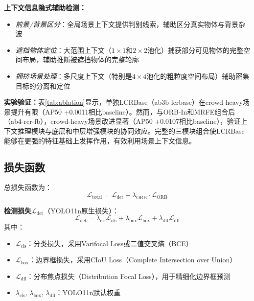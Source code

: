\documentclass[journal]{IEEEtran}
\begin{document}
\textbf{上下文信息隐式辅助检测：}
\begin{itemize}
    \item \textit{前景/背景区分}：全局场景上下文提供判别线索，辅助区分真实物体与背景杂波
    \item \textit{遮挡物体定位}：大范围上下文（$1 \times 1$和$2 \times 2$池化）捕获部分可见物体的完整空间布局，辅助推断被遮挡物体的完整轮廓
    \item \textit{拥挤场景处理}：多尺度上下文（特别是$4 \times 4$池化的粗粒度空间布局）辅助密集目标的分离和定位
\end{itemize}

\textbf{实验验证：}表\ref{tab:ablation}显示，单独LCRBase（ab3b-lcrbase）在crowd-heavy场景提升有限（AP50 +0.0011相比baseline）。然而，与ORB-In和MRFE组合后（ab4-rcr-fb），crowd-heavy场景改进显著（AP50 +0.0107相比baseline），验证上下文推理模块与底层和中层增强模块的协同效应。完整的三模块组合使LCRBase能够在更强的特征基础上发挥作用，有效利用场景上下文信息。


\subsection{损失函数}
\label{subsec:loss_function}

总损失函数为：
\begin{equation}
\mathcal{L}_{\text{total}} = \mathcal{L}_{\text{det}} + \lambda_{\text{ORB}} \cdot \mathcal{L}_{\text{ORB}}
\end{equation}

\textbf{检测损失}$\mathcal{L}_{\text{det}}$（YOLO11n原生损失）：
\begin{equation}
\mathcal{L}_{\text{det}} = \lambda_{\text{cls}} \mathcal{L}_{\text{cls}} + \lambda_{\text{box}} \mathcal{L}_{\text{box}} + \lambda_{\text{dfl}} \mathcal{L}_{\text{dfl}}
\end{equation}
其中：
\begin{itemize}
    \item $\mathcal{L}_{\text{cls}}$：分类损失，采用Varifocal Loss或二值交叉熵（BCE）
    \item $\mathcal{L}_{\text{box}}$：边界框损失，采用CIoU Loss（Complete Intersection over Union）
    \item $\mathcal{L}_{\text{dfl}}$：分布焦点损失（Distribution Focal Loss），用于精细化边界框预测
    \item $\lambda_{\text{cls}}$, $\lambda_{\text{box}}$, $\lambda_{\text{dfl}}$：YOLO11n默认权重
\end{itemize}
\end{document}
